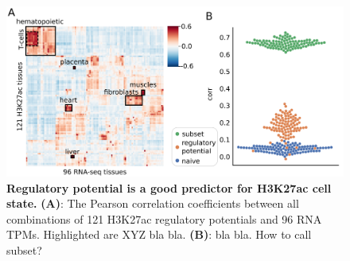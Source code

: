 \begin{figure}
    \centering
    \includegraphics[width=1\linewidth]{ch.scepia/imgs/celltypes.png}
    \caption{\textbf{Regulatory potential is a good predictor for H3K27ac cell state.} \textbf{(A)}: The Pearson correlation coefficients between all combinations of 121 H3K27ac regulatory potentials and 96 RNA TPMs. Highlighted are XYZ bla bla. \textbf{(B)}: bla bla. How to call subset?}
    \label{fig:bulk_comparison}
\end{figure}

